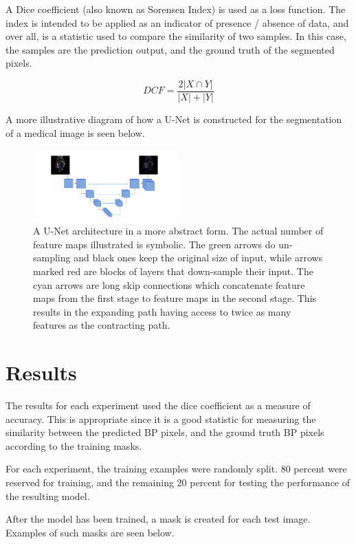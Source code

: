 \documentclass[letterpaper]{article}
\begin{document}
A Dice coefficient (also known as Sorensen Index) is used as a loss function. The index is intended to be applied as an indicator of presence / absence of data, and over all, is a statistic used to compare the similarity of two samples. In this case, the samples are the prediction output, and the ground truth of the segmented pixels.   

$$DCF = \frac{2 |  X \cap Y | }{ | X | + | Y |} $$

A more illustrative diagram of how a U-Net is constructed for the segmentation of a medical image is seen below. 

 \begin{figure}[H]
  \centerline{\includegraphics[width=0.5\textwidth]{Images/UNETMedical.png}}
  \caption{A U-Net architecture in a more abstract form. The actual number of feature maps illustrated is symbolic. The green arrows do un-sampling and black ones keep the original size of input, while arrows marked red are blocks of layers that down-sample their input. The cyan arrows are long skip connections which concatenate feature maps from the first stage to feature maps in the second stage. This results in the expanding path having access to twice as many features as the contracting path.}
  \label{fig:kerasunet3}
\end{figure}



\section{Results}
The results for each experiment used the dice coefficient as a measure of accuracy. This is appropriate since it is a good statistic for measuring the similarity between the predicted BP pixels, and the ground truth BP pixels according to the training masks. 

For each experiment, the training examples were randomly split. 80 percent were reserved for training, and the remaining 20 percent for testing the performance of the resulting model.

After the model has been trained, a mask is created for each test image. Examples of such masks are seen below.
\end{document}
